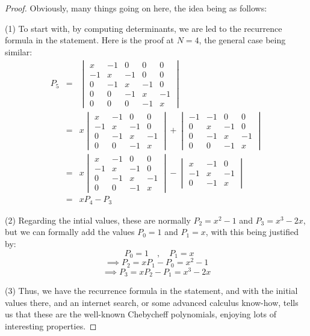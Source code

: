 \documentclass[12pt]{amsbook}
\begin{document}
\begin{proof}
Obviously, many things going on here, the idea being as follows:

\medskip

(1) To start with, by computing determinants, we are led to the recurrence formula in the statement. Here is the proof at $N=4$, the general case being similar:
\begin{eqnarray*}
P_5
&=&\begin{vmatrix}
x&-1&0&0&0\\
-1&x&-1&0&0\\
0&-1&x&-1&0\\
0&0&-1&x&-1\\
0&0&0&-1&x
\end{vmatrix}\\
&=&x\begin{vmatrix}
x&-1&0&0\\
-1&x&-1&0\\
0&-1&x&-1\\
0&0&-1&x
\end{vmatrix}
+\begin{vmatrix}
-1&-1&0&0\\
0&x&-1&0\\
0&-1&x&-1\\
0&0&-1&x
\end{vmatrix}\\
&=&x\begin{vmatrix}
x&-1&0&0\\
-1&x&-1&0\\
0&-1&x&-1\\
0&0&-1&x
\end{vmatrix}
-\begin{vmatrix}
x&-1&0\\
-1&x&-1\\
0&-1&x
\end{vmatrix}\\
&=&xP_4-P_3
\end{eqnarray*}

(2) Regarding the intial values, these are normally $P_2=x^2-1$ and $P_3=x^3-2x$, but we can formally add the values $P_0=1$ and $P_1=x$, with this being justified by:
$$\ \ \ P_0=1\quad,\quad 
P_1=x$$
$$\implies P_2=xP_1-P_0=x^2-1$$
$$\implies P_3=xP_2-P_1=x^3-2x$$

(3) Thus, we have the recurrence formula in the statement, and with the initial values there, and an internet search, or some advanced calculus know-how, tells us that these are the well-known Chebycheff polynomials, enjoying lots of interesting properties.


\end{proof}
\end{document}
